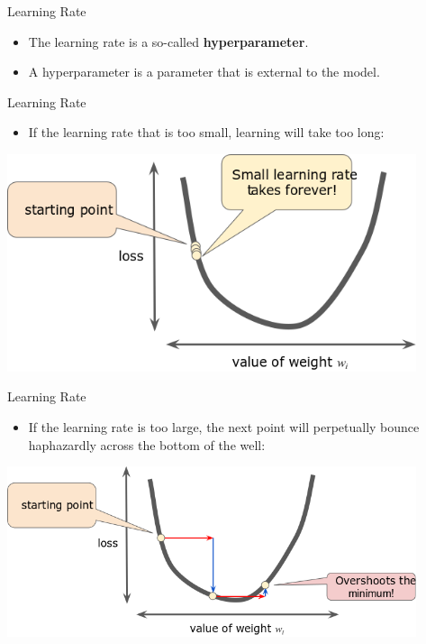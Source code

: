 \documentclass{beamer}
\begin{document}

\begin{frame}{Learning Rate}
\begin{itemize}
\item The learning rate is a so-called {\bf hyperparameter}. 

\medskip
\item A hyperparameter is a parameter that is external to the model.
\end{itemize}
\end{frame}


\begin{frame}{Learning Rate}
\begin{itemize}
\item If the learning rate that is too small, learning will take too long:
\end{itemize}
\includegraphics[width=0.9\textwidth]{images/LearningRateTooSmall.png}
\end{frame}



\begin{frame}{Learning Rate}
\begin{itemize}
\item If the learning rate is too large, the next point will perpetually bounce haphazardly across the bottom of the well:
\end{itemize}
\includegraphics[width=0.9\textwidth]{images/LearningRateTooLarge.png}
\end{frame}
\end{document}
